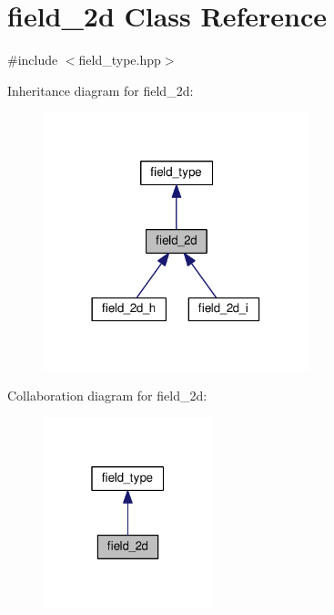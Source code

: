\hypertarget{classfield__2d}{}\section{field\+\_\+2d Class Reference}
\label{classfield__2d}


{\ttfamily \#include $<$field\+\_\+type.\+hpp$>$}



Inheritance diagram for field\+\_\+2d\+:
\nopagebreak
\begin{figure}[H]
\begin{center}
\leavevmode
\includegraphics[width=218pt]{d1/de5/classfield__2d__inherit__graph}
\end{center}
\end{figure}


Collaboration diagram for field\+\_\+2d\+:
\nopagebreak
\begin{figure}[H]
\begin{center}
\leavevmode
\includegraphics[width=139pt]{d4/d0c/classfield__2d__coll__graph}
\end{center}
\end{figure}
